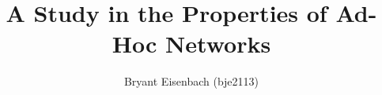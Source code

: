 \def\authorship{Bryant Eisenbach (bje2113)}
\def\class{ELEN E6950}

\author{\authorship}
\title{A Study in the Properties of Ad-Hoc Networks}
